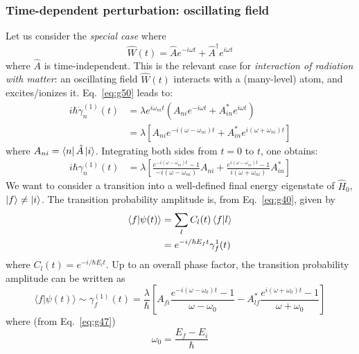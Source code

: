 \documentclass[12pt]{article}
\newcommand{\be}{\begin{equation}}
\newcommand{\ee}{\end{equation}}
\begin{document}
\subsubsection{Time-dependent perturbation: oscillating field}

Let us consider the \emph{special case} where
\be
\hat{W}(t) = \hat{A}e^{-i\omega t} + \hat{A}^\dagger e^{i\omega t}
\ee
where $\hat{A}$ is time-independent.
This is the relevant case for \emph{interaction of radiation with matter}:
an oscillating field $\hat{W}(t)$ interacts with a (many-level) atom, and excites/ionizes it.
Eq.~\eqref{eq:g50} leads to:
\be
\begin{aligned} 
i \hbar \dot{\gamma}_{n}^{(1)}(t) 
&=\lambda e^{i \omega_{n i} t}\left(A_{n i} e^{-i \omega t}+A_{i n}^{*} e^{i \omega t}\right) \\
&=\lambda\left[A_{n i} e^{-i\left(\omega-\omega_{n i}\right) t}+A_{i n}^{*} e^{i\left(\omega+\omega_{n i}\right) t}\right] 
\end{aligned}
\ee
where $A_{ni} = \bra{n}\hat{A}\ket{i}$.
Integrating both sides from $t=0$ to $t$,
one obtains:
\be
\begin{aligned}
i \hbar \gamma_{n}^{(1)} (t) 
&=\lambda\left[
\frac{e^{-i\left(\omega-\omega_{n i}\right) t}-1}{-i\left(\omega-\omega_{n i}\right)} A_{n i}
+
\frac{e^{i\left(\omega-\omega_{n i}\right) t}-1}{i\left(\omega+\omega_{n i}\right)} A_{i n}^{*}\right]
\end{aligned}
\ee
We want to consider a transition into a well-defined
final energy eigenstate of $\hat{H}_{0}$, $\ket{f} \neq \ket{i}$. The
transition probability amplitude is, from
Eq.~\eqref{eq:g40}, given by
\be
\begin{aligned}
\bra{f}\ket{\psi(t)}
&= \sum_l C_l(t) \bra{f}\ket{l}\\
&= e^{-i/\hbar E_f t} \gamma_f^{1}(t)
\end{aligned}
\ee
where $C_l(t) = e^{-i/\hbar E_l t}$.
Up to an overall phase factor, the transition probability
amplitude can be written as
\be
\langle f | \psi(t)\rangle \sim \gamma_{f}^{(1)}(t) 
=\frac{\lambda}{\hbar}
\left[A_{f i} \frac{e^{-i\left(\omega-\omega_{0}\right) t}-1}{\omega-\omega_{0}}\right.-A_{l f}^{*} \left.\frac{e^{i\left(\omega+\omega_{0}\right) t}-1}{\omega+\omega_{0}}\right] 
\ee
where (from Eq.~\eqref{eq:g47})
\be
\omega_0 = \frac{E_f - E_i}{\hbar}
\ee

\end{document}
